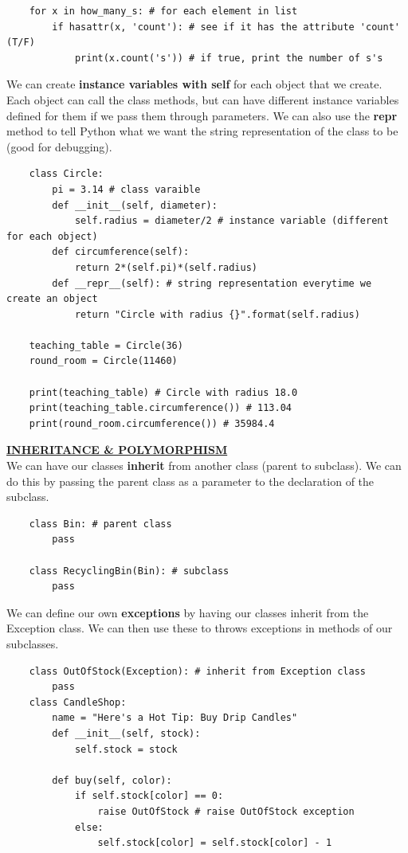 \documentclass[11pt, a4paper]{article}
\begin{document}
\begin{spacing}{1.1}
\begin{lstlisting}
	for x in how_many_s: # for each element in list
		if hasattr(x, 'count'): # see if it has the attribute 'count' (T/F)
			print(x.count('s')) # if true, print the number of s's \end{lstlisting}\vspace*{1mm}
	We can create \textbf{instance variables with self} for each object that we create. Each object can call the class methods, but can have different instance variables defined for them if we pass them through parameters. We can also use the \textbf{repr} method to tell Python what we want the string representation of the class to be (good for debugging).
	\begin{lstlisting}
	class Circle:
		pi = 3.14 # class varaible
		def __init__(self, diameter):
			self.radius = diameter/2 # instance variable (different for each object)
		def circumference(self):
			return 2*(self.pi)*(self.radius)
		def __repr__(self): # string representation everytime we create an object
			return "Circle with radius {}".format(self.radius)
	
	teaching_table = Circle(36)
	round_room = Circle(11460)
	
	print(teaching_table) # Circle with radius 18.0
	print(teaching_table.circumference()) # 113.04
	print(round_room.circumference()) # 35984.4 \end{lstlisting}\vspace*{3mm}
	
	\noindent \underline{\textbf{INHERITANCE \& POLYMORPHISM}} \vspace*{1mm} \\
	We can have our classes \textbf{inherit} from another class (parent to subclass). We can do this by passing the parent class as a parameter to the declaration of the subclass. 
	\begin{lstlisting}
	class Bin: # parent class
		pass
	
	class RecyclingBin(Bin): # subclass
		pass \end{lstlisting}\vspace*{1mm}
	We can define our own \textbf{exceptions} by having our classes inherit from the Exception class. We can then use these to throws exceptions in methods of our subclasses. 
	\begin{lstlisting}
	class OutOfStock(Exception): # inherit from Exception class
		pass
	class CandleShop:
		name = "Here's a Hot Tip: Buy Drip Candles"
		def __init__(self, stock):
			self.stock = stock
	
		def buy(self, color):
			if self.stock[color] == 0:
				raise OutOfStock # raise OutOfStock exception
			else:
				self.stock[color] = self.stock[color] - 1
	

\end{lstlisting}
\end{spacing}
\end{document}
